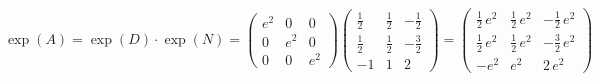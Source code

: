 \documentclass[12pt, class=report,crop=false]{standalone}
\begin{document}
\begin{exemple}
\begin{itemize}
$$\exp(A) = \exp(D) \cdot \exp(N)
= \begin{pmatrix}
e^2 & 0 & 0 \\
0 & e^2 & 0 \\
0 & 0 & e^2
\end{pmatrix}
\begin{pmatrix}
\frac{1}{2} & \frac{1}{2} & -\frac{1}{2} \\
\frac{1}{2} & \frac{1}{2} & -\frac{3}{2} \\
-1 & 1 & 2
\end{pmatrix}
= 
\begin{pmatrix}
\frac{1}{2} \, e^{2} & \frac{1}{2} \, e^{2} & -\frac{1}{2} \, e^{2} \\
\frac{1}{2} \, e^{2} & \frac{1}{2} \, e^{2} & -\frac{3}{2} \, e^{2} \\
-e^{2} & e^{2} & 2 \, e^{2}
\end{pmatrix}
$$
\end{itemize}
\end{exemple}
\end{document}
